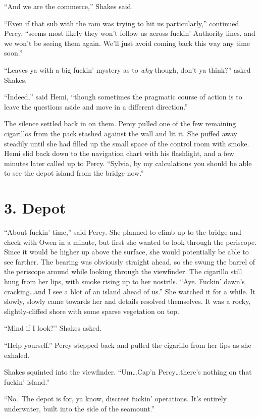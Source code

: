 \documentclass[
]{scrbook}
\begin{document}
``And we are the commerce,'' Shakes said.

``Even if that sub with the ram was trying to hit us particularly,''
continued Percy, ``seems most likely they won't follow us across fuckin'
Authority lines, and we won't be seeing them again. We'll just avoid
coming back this way any time soon.''

``Leaves ya with a big fuckin' mystery as to \emph{why} though, don't ya
think?'' asked Shakes.

``Indeed,'' said Hemi, ``though sometimes the pragmatic course of action
is to leave the questions aside and move in a different direction.''

The silence settled back in on them. Percy pulled one of the few
remaining cigarillos from the pack stashed against the wall and lit it.
She puffed away steadily until she had filled up the small space of the
control room with smoke. Hemi slid back down to the navigation chart
with his flashlight, and a few minutes later called up to Percy.
``Sylvia, by my calculations you should be able to see the depot island
from the bridge now.''

\newpage

\hypertarget{depot}{%
\section{3. Depot}\label{depot}}

``About fuckin' time,'' said Percy. She planned to climb up to the
bridge and check with Owen in a minute, but first she wanted to look
through the periscope. Since it would be higher up above the surface,
she would potentially be able to see farther. The bearing was obviously
straight ahead, so she swung the barrel of the periscope around while
looking through the viewfinder. The cigarillo still hung from her lips,
with smoke rising up to her nostrils. ``Aye. Fuckin' dawn's
cracking\ldots and I see a blot of an island ahead of us.'' She watched
it for a while. It slowly, slowly came towards her and details resolved
themselves. It was a rocky, slightly-cliffed shore with some sparse
vegetation on top.

``Mind if I look?'' Shakes asked.

``Help yourself.'' Percy stepped back and pulled the cigarillo from her
lips as she exhaled.

Shakes squinted into the viewfinder. ``Um\ldots Cap'n
Percy\ldots there's nothing on that fuckin' island.''

``No.~The depot is for, ya know, discreet fuckin' operations. It's
entirely underwater, built into the side of the seamount.''
\end{document}
